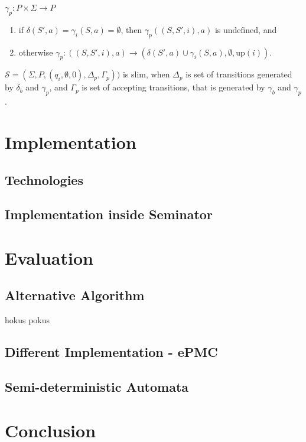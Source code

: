 \documentclass[
	digital
nolof, nolot
]{fithesis3}
\newcommand{\cS}{\mathcal{S}}
\begin{document}
		
				$\gamma_{p}: P \times \Sigma \rightarrow P$
			\begin{enumerate}
				\item if $\delta(S',a)=\gamma_{i}(S, a)=\emptyset$, then $ \gamma_{p}((S,S',i),a)$ is undefined, and
				\item otherwise $\gamma_p : ((S,S',i),a)\rightarrow (\delta(S',a)\cup \gamma_{i}(S, a), \emptyset, \text{up}(i))$.
			\end{enumerate}
			$\cS=(\Sigma, P, (q_i,\emptyset,0), \Delta_p,\Gamma_p))$ is slim, when $\Delta_p$ is set of transitions generated by $\delta_b$ and $\gamma_p$, and $\Gamma_p$ is set of accepting transitions, that is generated by $\gamma_b$ and $\gamma_p$.
			
	\chapter{Implementation}
		\section{Technologies}
		\section{Implementation inside Seminator}
	\chapter{Evaluation}
		\section{Alternative Algorithm}
			hokus pokus
		\section{Different Implementation - ePMC}
		\section{Semi-deterministic Automata}
	\chapter{Conclusion}
\end{document}
